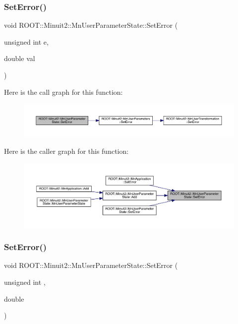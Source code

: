 \subsubsection{\texorpdfstring{SetError()}{SetError()}\hspace{0.1cm}{\footnotesize\ttfamily [1/4]}}
{\footnotesize\ttfamily void R\+O\+O\+T\+::\+Minuit2\+::\+Mn\+User\+Parameter\+State\+::\+Set\+Error (\begin{DoxyParamCaption}\item[{unsigned int}]{e,  }\item[{double}]{val }\end{DoxyParamCaption})}

Here is the call graph for this function\+:\nopagebreak
\begin{figure}[H]
\begin{center}
\leavevmode
\includegraphics[width=350pt]{d3/de0/classROOT_1_1Minuit2_1_1MnUserParameterState_adf2a80e9887b97dcc01b65184281aaa5_cgraph}
\end{center}
\end{figure}
Here is the caller graph for this function\+:\nopagebreak
\begin{figure}[H]
\begin{center}
\leavevmode
\includegraphics[width=350pt]{d3/de0/classROOT_1_1Minuit2_1_1MnUserParameterState_adf2a80e9887b97dcc01b65184281aaa5_icgraph}
\end{center}
\end{figure}
\mbox{\label{classROOT_1_1Minuit2_1_1MnUserParameterState_adf2a80e9887b97dcc01b65184281aaa5}} 
\subsubsection{\texorpdfstring{SetError()}{SetError()}\hspace{0.1cm}{\footnotesize\ttfamily [2/4]}}
{\footnotesize\ttfamily void R\+O\+O\+T\+::\+Minuit2\+::\+Mn\+User\+Parameter\+State\+::\+Set\+Error (\begin{DoxyParamCaption}\item[{unsigned int}]{,  }\item[{double}]{ }\end{DoxyParamCaption})}

